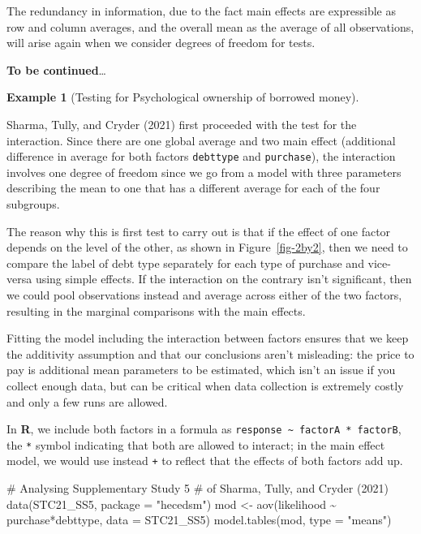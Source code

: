 \documentclass[
  11pt,
  letterpaper,
]{scrbook}
\newenvironment{Shaded}{\begin{snugshade}}{\end{snugshade}}
\newcommand{\AttributeTok}[1]{\textcolor[rgb]{0.40,0.45,0.13}{#1}}
\newcommand{\CommentTok}[1]{\textcolor[rgb]{0.37,0.37,0.37}{#1}}
\newcommand{\FunctionTok}[1]{\textcolor[rgb]{0.28,0.35,0.67}{#1}}
\newcommand{\NormalTok}[1]{\textcolor[rgb]{0.00,0.23,0.31}{#1}}
\newcommand{\OtherTok}[1]{\textcolor[rgb]{0.00,0.23,0.31}{#1}}
\newcommand{\SpecialCharTok}[1]{\textcolor[rgb]{0.37,0.37,0.37}{#1}}
\newcommand{\StringTok}[1]{\textcolor[rgb]{0.13,0.47,0.30}{#1}}
\theoremstyle{definition}
\newtheorem{example}{Example}[chapter]
\theoremstyle{remark}
\begin{document}
The redundancy in information, due to the fact main effects are
expressible as row and column averages, and the overall mean as the
average of all observations, will arise again when we consider degrees
of freedom for tests.

\textbf{To be continued}\ldots{}

\begin{example}[Testing for Psychological ownership of borrowed
money]\protect\hypertarget{exm-borrowed-money-test}{}\label{exm-borrowed-money-test}

Sharma, Tully, and Cryder (2021) first proceeded with the test for the
interaction. Since there are one global average and two main effect
(additional difference in average for both factors \texttt{debttype} and
\texttt{purchase}), the interaction involves one degree of freedom since
we go from a model with three parameters describing the mean to one that
has a different average for each of the four subgroups.

The reason why this is first test to carry out is that if the effect of
one factor depends on the level of the other, as shown in
Figure~\ref{fig-2by2}, then we need to compare the label of debt type
separately for each type of purchase and vice-versa using simple
effects. If the interaction on the contrary isn't significant, then we
could pool observations instead and average across either of the two
factors, resulting in the marginal comparisons with the main effects.

Fitting the model including the interaction between factors ensures that
we keep the additivity assumption and that our conclusions aren't
misleading: the price to pay is additional mean parameters to be
estimated, which isn't an issue if you collect enough data, but can be
critical when data collection is extremely costly and only a few runs
are allowed.

In \textbf{R}, we include both factors in a formula as
\texttt{response\ \textasciitilde{}\ factorA\ *\ factorB}, the
\texttt{*} symbol indicating that both are allowed to interact; in the
main effect model, we would use instead \texttt{+} to reflect that the
effects of both factors add up.

\begin{Shaded}
\begin{Highlighting}[]
\CommentTok{\# Analysing Supplementary Study 5}
\CommentTok{\# of Sharma, Tully, and Cryder (2021)}
\FunctionTok{data}\NormalTok{(STC21\_SS5, }\AttributeTok{package =} \StringTok{"hecedsm"}\NormalTok{)}
\NormalTok{mod }\OtherTok{\textless{}{-}} \FunctionTok{aov}\NormalTok{(likelihood }\SpecialCharTok{\textasciitilde{}}\NormalTok{ purchase}\SpecialCharTok{*}\NormalTok{debttype, }
           \AttributeTok{data =}\NormalTok{ STC21\_SS5)}
\FunctionTok{model.tables}\NormalTok{(mod, }\AttributeTok{type =} \StringTok{"means"}\NormalTok{)}
\end{Highlighting}
\end{Shaded}


\end{example}
\end{document}
